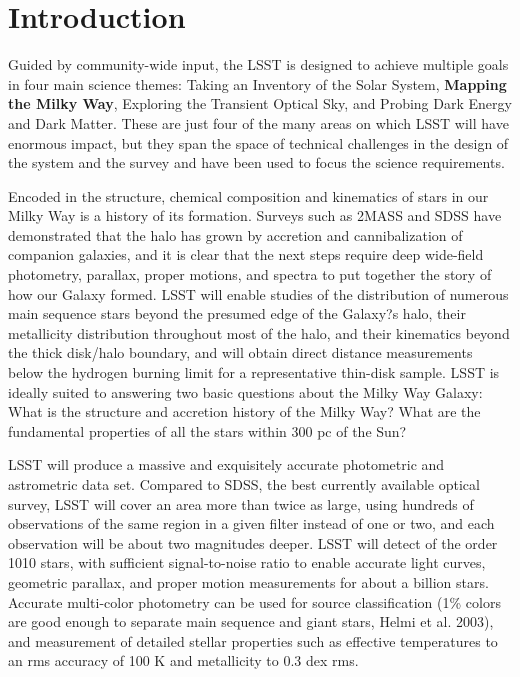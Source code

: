 \section{Introduction}

Guided by community-wide input, the LSST is designed to achieve multiple goals in four main
science themes: Taking an Inventory of the Solar System, {\bf Mapping the Milky Way}, Exploring the
Transient Optical Sky, and Probing Dark Energy and Dark Matter. These are just four of the many
areas on which LSST will have enormous impact, but they span the space of technical challenges
in the design of the system and the survey and have been used to focus the science requirements.


Encoded in the structure, chemical composition and kinematics of stars in our Milky Way is
a history of its formation. Surveys such as 2MASS and SDSS have demonstrated that the
halo has grown by accretion and cannibalization of companion galaxies, and it is clear that
the next steps require deep wide-field photometry, parallax, proper motions, and spectra to
put together the story of how our Galaxy formed. LSST will enable studies of the distribution of 
numerous main sequence stars beyond the presumed edge of the Galaxy?s halo,
their metallicity distribution throughout most of the halo, and their kinematics beyond the
thick disk/halo boundary, and will obtain direct distance measurements below the hydrogen burning limit for a representative thin-disk sample. 
LSST is ideally suited to answering two
basic questions about the Milky Way Galaxy: What is the structure and accretion history of
the Milky Way? What are the fundamental properties of all the stars within 300 pc of the
Sun?


LSST will produce a massive and exquisitely accurate photometric and astrometric data set.
Compared to SDSS, the best currently available optical survey, LSST will cover an area more
than twice as large, using hundreds of observations of the same region in a given filter instead
of one or two, and each observation will be about two magnitudes deeper. LSST will detect
of the order 1010 stars, with sufficient signal-to-noise ratio to enable accurate light curves,
geometric parallax, and proper motion measurements for about a billion stars. Accurate
multi-color photometry can be used for source classification (1\% colors are good enough to
separate main sequence and giant stars, Helmi et al. 2003), and measurement of detailed
stellar properties such as effective temperatures to an rms accuracy of 100 K and metallicity
to 0.3 dex rms.

